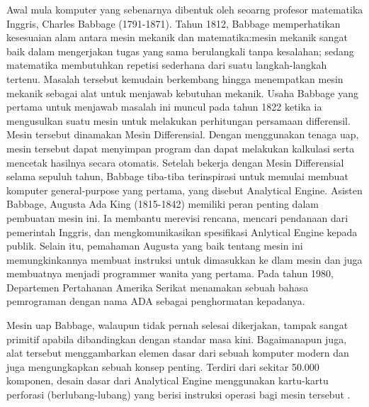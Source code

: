 Awal mula komputer yang sebenarnya dibentuk oleh seoarng profesor matematika Inggris, Charles
Babbage (1791-1871). Tahun 1812, Babbage memperhatikan kesesuaian alam antara mesin
mekanik dan matematika:mesin mekanik sangat baik dalam mengerjakan tugas yang sama
berulangkali tanpa kesalahan; sedang matematika membutuhkan repetisi sederhana dari suatu
langkah-langkah tertenu. Masalah tersebut kemudain berkembang hingga menempatkan mesin
mekanik sebagai alat untuk menjawab kebutuhan mekanik. Usaha Babbage yang pertama untuk
menjawab masalah ini muncul pada tahun 1822 ketika ia mengusulkan suatu mesin untuk melakukan
perhitungan persamaan differensil. Mesin tersebut dinamakan Mesin Differensial. Dengan
menggunakan tenaga uap, mesin tersebut dapat menyimpan program dan dapat melakukan kalkulasi serta mencetak hasilnya secara otomatis. Setelah bekerja dengan Mesin Differensial selama sepuluh
tahun, Babbage tiba-tiba terinspirasi untuk memulai membuat komputer general-purpose yang
pertama, yang disebut Analytical Engine. Asisten Babbage, Augusta Ada King (1815-1842)
memiliki peran penting dalam pembuatan mesin ini. Ia membantu merevisi rencana, mencari
pendanaan dari pemerintah Inggris, dan mengkomunikasikan spesifikasi Anlytical Engine kepada
publik. Selain itu, pemahaman Augusta yang baik tentang mesin ini memungkinkannya membuat
instruksi untuk dimasukkan ke dlam mesin dan juga membuatnya menjadi programmer wanita yang
pertama. Pada tahun 1980, Departemen Pertahanan Amerika Serikat menamakan sebuah bahasa
pemrograman dengan nama ADA sebagai penghormatan kepadanya.

Mesin uap Babbage, walaupun tidak pernah selesai dikerjakan, tampak sangat primitif apabila
dibandingkan dengan standar masa kini. Bagaimanapun juga, alat tersebut menggambarkan elemen
dasar dari sebuah komputer modern dan juga mengungkapkan sebuah konsep penting. Terdiri dari
sekitar 50.000 komponen, desain dasar dari Analytical Engine menggunakan kartu-kartu perforasi
(berlubang-lubang) yang berisi instruksi operasi bagi mesin tersebut \cite{sudirman2003sejarah}.

